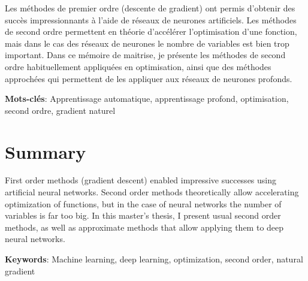 \documentclass[12pt,maitrise,nobabel,anglais,twoside,initial]{template/dms}
\numberwithin{equation}{section}
\numberwithin{table}{chapter}
\numberwithin{figure}{chapter}
\begin{document}
\noindent Les méthodes de premier ordre (descente de gradient) ont permis d'obtenir des succès impressionnants à l'aide de réseaux de neurones artificiels. Les méthodes de second ordre permettent en théorie d'accélérer l'optimisation d'une fonction, mais dans le cas des réseaux de neurones le nombre de variables est bien trop important. Dans ce mémoire de maitrise, je présente les méthodes de second ordre habituellement appliquées en optimisation, ainsi que des méthodes approchées qui permettent de les appliquer aux réseaux de neurones profonds.

\textbf{Mots-clés}: Apprentissage automatique, apprentissage profond, optimisation, second ordre, gradient naturel

\chapter*{Summary}

\noindent First order methods (gradient descent) enabled impressive successes using artificial neural networks. Second order methods theoretically allow accelerating optimization of functions, but in the case of neural networks the number of variables is far too big. In this master's thesis, I present usual second order methods, as well as approximate methods that allow applying them to deep neural networks. 

\textbf{Keywords}: Machine learning, deep learning, optimization, second order, natural gradient

\cleardoublepage
{}  %
\tableofcontents				%
\cleardoublepage
{}
\listoftables
\cleardoublepage
{}
\listoffigures	


\end{document}

